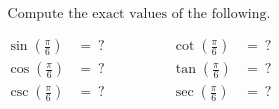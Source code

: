 $$
\text{Compute the exact values of the following.}
$$

$$
\begin{align*}
  \sin\left(\frac{\pi}{6}\right) &=\ ? \qquad&\qquad \cot\left(\frac{\pi}{6}\right) &=\ ? \\[2ex]
  \cos\left(\frac{\pi}{6}\right) &=\ ? \qquad&\qquad \tan\left(\frac{\pi}{6}\right) &=\ ? \\[2ex]
  \csc\left(\frac{\pi}{6}\right) &=\ ? \qquad&\qquad \sec\left(\frac{\pi}{6}\right) &=\ ?
\end{align*}
$$
